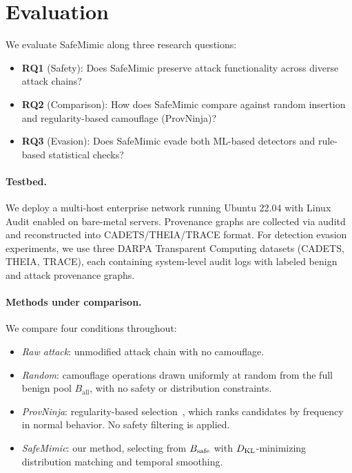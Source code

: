 \section{Evaluation}
\label{sec:evaluation}

We evaluate SafeMimic along three research questions:

\begin{itemize}
    \item \textbf{RQ1} (Safety): Does SafeMimic preserve attack functionality across diverse attack chains?
    \item \textbf{RQ2} (Comparison): How does SafeMimic compare against random insertion and regularity-based camouflage (ProvNinja)?
    \item \textbf{RQ3} (Evasion): Does SafeMimic evade both ML-based detectors and rule-based statistical checks?
\end{itemize}

\paragraph{Testbed.}
We deploy a multi-host enterprise network running Ubuntu 22.04 with Linux Audit enabled on bare-metal servers.
Provenance graphs are collected via auditd and reconstructed into CADETS/THEIA/TRACE format.
For detection evasion experiments, we use three DARPA Transparent Computing datasets (CADETS, THEIA, TRACE), each containing system-level audit logs with labeled benign and attack provenance graphs.

\paragraph{Methods under comparison.}
We compare four conditions throughout:
\begin{itemize}
    \item[\textbf{A}] \emph{Raw attack}: unmodified attack chain with no camouflage.
    \item[\textbf{B}] \emph{Random}: camouflage operations drawn uniformly at random from the full benign pool $B_{\text{all}}$, with no safety or distribution constraints.
    \item[\textbf{C}] \emph{ProvNinja}: regularity-based selection~\cite{provninja}, which ranks candidates by frequency in normal behavior. No safety filtering is applied.
    \item[\textbf{D}] \emph{SafeMimic}: our method, selecting from $B_{\text{safe}}$ with $D_{\text{KL}}$-minimizing distribution matching and temporal smoothing.
\end{itemize}

